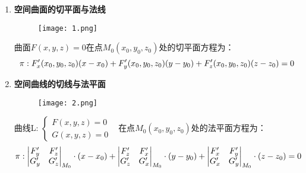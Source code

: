 \documentclass[12pt]{scrartcl}
\begin{document}
{\begin{enumerate}
\begin{enumerate}
        \item \textbf{空间曲面的切平面与法线}
        \begin{figure}[H]
            \centering
            \texttt{[image: 1.png]}
            \end{figure}
        曲面$F(x,y,z)=0$在点$M_0(x_0,y_0,z_0)$处的切平面方程为：
        \begin{equation}
            \pi:F'_x(x_0,y_0,z_0)(x-x_0)+F'_y(x_0,y_0,z_0)(y-y_0)+F'_z(x_0,y_0,z_0)(z-z_0)=0 \notag
        \end{equation}
        \item \textbf{空间曲线的切线与法平面}
        \begin{figure}[H]
            \centering
            \texttt{[image: 2.png]}
            \end{figure}
            曲线L:
            $\left\{
            \begin{array}{lr}
            F(x,y,z)=0 &  \\
            G(x,y,z)=0 &  
            \end{array}
            \right.$在点$M_0(x_0,y_0,z_0)$处的法平面方程为：
            \begin{equation}
                \pi: 
                \begin{vmatrix}F'_y&F'_z\\G'_y&G'_z\end{vmatrix}_{M_0}\cdot (x-x_0)+
                \begin{vmatrix}F'_z&F'_x\\G'_z&G'_x\end{vmatrix}_{M_0}\cdot (y-y_0)+
                \begin{vmatrix}F'_x&F'_y\\G'_x&G'_y\end{vmatrix}_{M_0}\cdot (z-z_0)=0
                \notag
            \end{equation}
    \end{enumerate}
\end{enumerate}

    

}
\end{document}
